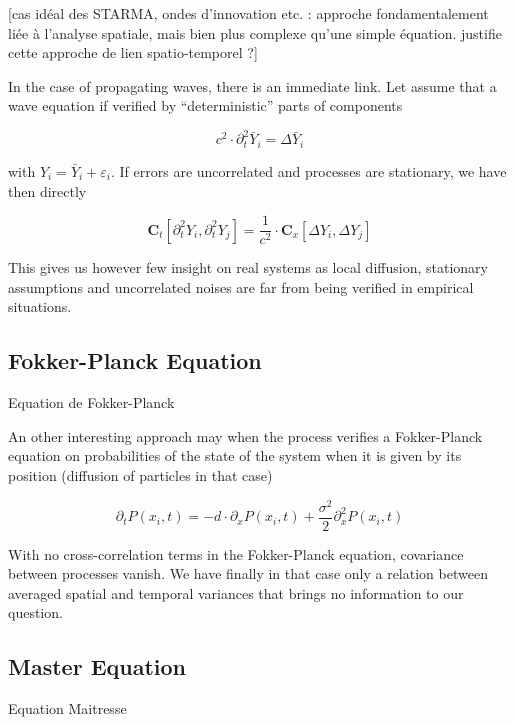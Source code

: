 [cas idéal des STARMA, ondes d'innovation etc. : approche fondamentalement liée à l'analyse spatiale, mais bien plus complexe qu'une simple équation. justifie cette approche de lien spatio-temporel ?]

In the case of propagating waves, there is an immediate link. Let assume that a wave equation if verified by ``deterministic'' parts of components

\begin{equation}
c^2 \cdot \partial^2_{t} \bar{Y}_i = \Delta \bar{Y}_i
\end{equation}

with $Y_i = \bar{Y}_i + \varepsilon_i$. If errors are uncorrelated and processes are stationary, we have then directly

\begin{equation}
\mathbf{C}_t \left[ \partial^2_t Y_i , \partial^2_t Y_j \right] = \frac{1}{c^2} \cdot\mathbf{C}_x \left[ \Delta Y_i , \Delta Y_j \right]
\end{equation}

This gives us however few insight on real systems as local diffusion, stationary assumptions and uncorrelated noises are far from being verified in empirical situations.

\subsection{Fokker-Planck Equation}{Equation de Fokker-Planck}

An other interesting approach may when the process verifies a Fokker-Planck equation on probabilities of the state of the system when it is given by its position (diffusion of particles in that case)

\begin{equation}
\partial_t P(x_i,t) = - d \cdot \partial_x P(x_i,t) + \frac{\sigma^2}{2} \partial^2_x P(x_i,t)
\end{equation}

With no cross-correlation terms in the Fokker-Planck equation, covariance between processes vanish. We have finally in that case only a relation between averaged spatial and temporal variances that brings no information to our question.

\subsection{Master Equation}{Equation Maitresse}

